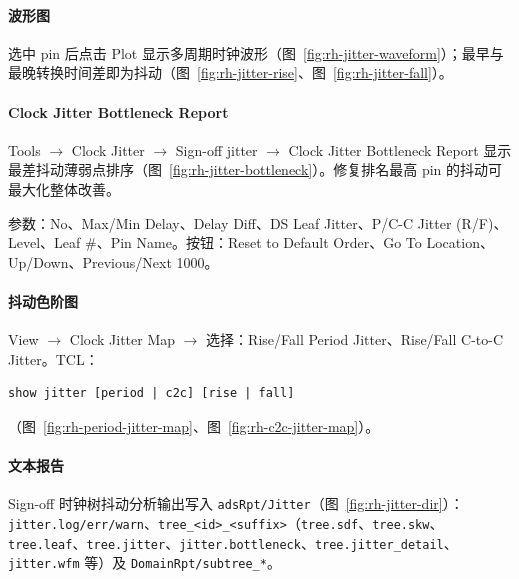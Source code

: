 \paragraph{波形图}
选中 pin 后点击 Plot 显示多周期时钟波形（图~\ref{fig:rh-jitter-waveform}）；最早与最晚转换时间差即为抖动（图~\ref{fig:rh-jitter-rise}、图~\ref{fig:rh-jitter-fall}）。




\paragraph{Clock Jitter Bottleneck Report}
Tools $\rightarrow$ Clock Jitter $\rightarrow$ Sign-off jitter $\rightarrow$ Clock Jitter Bottleneck Report 显示最差抖动薄弱点排序（图~\ref{fig:rh-jitter-bottleneck}）。修复排名最高 pin 的抖动可最大化整体改善。

参数：No、Max/Min Delay、Delay Diff、DS Leaf Jitter、P/C-C Jitter (R/F)、Level、Leaf \#、Pin Name。按钮：Reset to Default Order、Go To Location、Up/Down、Previous/Next 1000。



\paragraph{抖动色阶图}
View $\rightarrow$ Clock Jitter Map $\rightarrow$ 选择：Rise/Fall Period Jitter、Rise/Fall C-to-C Jitter。TCL：
\begin{lstlisting}
show jitter [period | c2c] [rise | fall]
\end{lstlisting}
（图~\ref{fig:rh-period-jitter-map}、图~\ref{fig:rh-c2c-jitter-map}）。



\paragraph{文本报告}
Sign-off 时钟树抖动分析输出写入 \texttt{adsRpt/Jitter}（图~\ref{fig:rh-jitter-dir}）：\texttt{jitter.log/err/warn}、\texttt{tree\_<id>\_<suffix>}（\texttt{tree.sdf}、\texttt{tree.skw}、\texttt{tree.leaf}、\texttt{tree.jitter}、\texttt{jitter.bottleneck}、\texttt{tree.jitter\_detail}、\texttt{jitter.wfm} 等）及 \texttt{DomainRpt/subtree\_*}。

